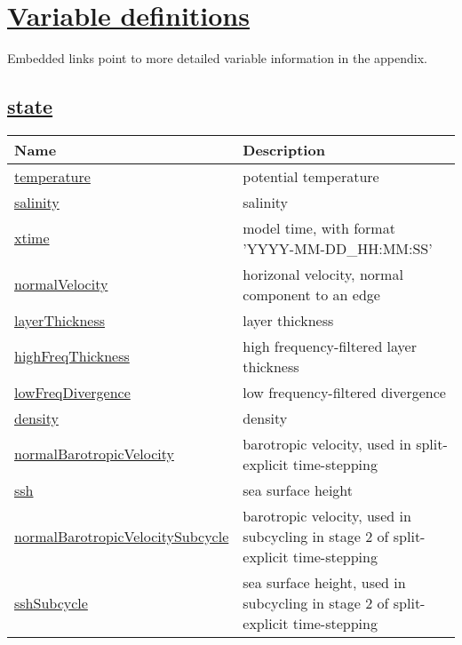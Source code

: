 \chapter[Variable definitions]{\hyperref[chap:variable_sections]{Variable definitions}}
\label{chap:variable_tables}
Embedded links point to more detailed variable information in the appendix.
\section[state]{\hyperref[sec:var_sec_state]{state}}
\label{sec:var_tab_state}

{\small
\begin{center}
\begin{longtable}{| p{2.0in} | p{4.0in} |}
	\hline
	{\bf Name} & {\bf Description} \\
	\hline
	\hyperref[subsec:var_sec_state_temperature]{temperature} & potential temperature \\
	\hline
	\hyperref[subsec:var_sec_state_salinity]{salinity} & salinity \\
	\hline
	\hyperref[subsec:var_sec_state_xtime]{xtime} & model time, with format 'YYYY-MM-DD\_HH:MM:SS' \\
	\hline
	\hyperref[subsec:var_sec_state_normalVelocity]{normalVelocity} & horizonal velocity, normal component to an edge \\
	\hline
	\hyperref[subsec:var_sec_state_layerThickness]{layerThickness} & layer thickness \\
	\hline
	\hyperref[subsec:var_sec_state_highFreqThickness]{highFreqThickness} & high frequency-filtered layer thickness \\
	\hline
	\hyperref[subsec:var_sec_state_lowFreqDivergence]{lowFreqDivergence} & low frequency-filtered divergence \\
	\hline
	\hyperref[subsec:var_sec_state_density]{density} & density \\
	\hline
	\hyperref[subsec:var_sec_state_normalBarotropicVelocity]{normalBarotropicVelocity} & barotropic velocity, used in split-explicit time-stepping \\
	\hline
	\hyperref[subsec:var_sec_state_ssh]{ssh} & sea surface height \\
	\hline
	\hyperref[subsec:var_sec_state_normalBarotropicVelocitySubcycle]{normalBarotropicVelocitySubcycle} & barotropic velocity, used in subcycling in stage 2 of split-explicit time-stepping \\
	\hline
	\hyperref[subsec:var_sec_state_sshSubcycle]{sshSubcycle} & sea surface height, used in subcycling in stage 2 of split-explicit time-stepping \\

\end{longtable}
\end{center}}
